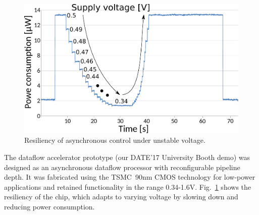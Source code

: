 \documentclass[conference]{IEEEtran}
\begin{document}
\begin{figure}[h!]
\begin{center}
  \includegraphics[width=0.8\linewidth]{FIG/ope-chip.pdf}
  \vspace{-3mm}
  \caption{Resiliency of asynchronous control under unstable voltage.}
  \label{fig:voltage-resiliency}
\end{center}
\vspace{-8mm}
\end{figure}

The dataflow accelerator prototype (our DATE'17 University Booth demo) was
designed as an asynchronous dataflow processor with reconfigurable pipeline depth.
It was fabricated using the TSMC~90nm CMOS technology for low-power applications
and retained functionality in the range 0.34-1.6V.
Fig.~\ref{fig:voltage-resiliency} shows the resiliency of the chip, which adapts
to varying voltage by slowing down and reducing power consumption.
\end{document}
